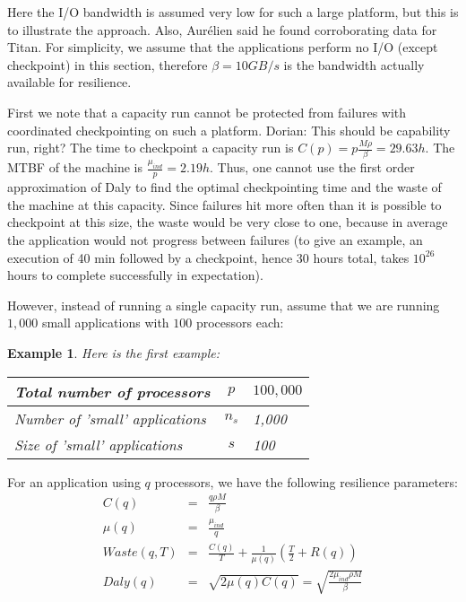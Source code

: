 \documentclass{article}
\newtheorem{example}{Example}
\newcommand{\ema}[1]{\ensuremath{#1}}
\newcommand{\Waste}{\ema{\mathit{Waste}}\xspace}
\newcommand{\Daly}{\ema{\mathit{Daly}}\xspace}
\newcommand{\dca}[1]{{\color{blue}Dorian: #1}}
\begin{document}
Here the I/O bandwidth is assumed very low for such a large platform, but this is 
to illustrate the approach. Also, Aurélien said he found corroborating data for Titan.
For simplicity, we assume that the applications perform no I/O (except checkpoint) in this section, therefore $\beta=10GB/s$ is the bandwidth actually available for resilience.

First we note that a capacity run cannot be protected from failures with coordinated
checkpointing on such a platform. \dca{This should be capability run, right?}  The
time to checkpoint a capacity run is $C(p) = p\frac{M \rho}{\beta} = 29.63h$. The
MTBF of the machine is $\frac{\mu_{ind}}{p} = 2.19h$. Thus, one cannot use the first
order approximation of Daly to find the optimal checkpointing time and the waste of
the machine at this capacity. Since failures hit more often than it is possible to
checkpoint at this size, the waste would be very close to one, because in average the
application would not progress between failures (to give an example, an execution of
40 min followed by a checkpoint, hence 30 hours total, takes $10^{26}$ hours to
complete successfully in expectation).

However, instead of running a single capacity run, assume that we are running
$1,000$ small applications with $100$ processors each:

\begin{example}
Here is the first example:
\begin{center}
\begin{tabular}{lcl}
  Total number of processors & $p$ & $100,000$\\\hline
  Number of 'small' applications & $n_{s}$ & 1,000\\\hline
  Size of 'small' applications & $s$ & 100\\\hline
\end{tabular}
\end{center}
\label{example1}
\end{example}

For an application using $q$ processors, we have the following resilience parameters:
\begin{eqnarray}
C(q) &=& \frac{q\rho M}{\beta}\\
\mu(q) &=& \frac{\mu_{ind}}{q}\\
\Waste(q, T) &=& \frac{C(q)}{T} + \frac{1}{\mu(q)}\left(\frac{T}{2}+R(q)\right)\\
\Daly(q) &=& \sqrt{2\mu(q)C(q)} = \sqrt{\frac{2\mu_{ind}\rho M}{\beta}}
\end{eqnarray}
\end{document}

